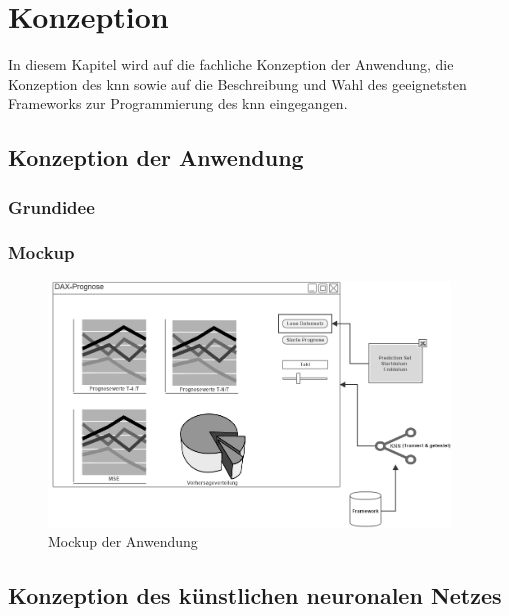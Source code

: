 \chapter{Konzeption}
\label{chapter:Konzeption}
In diesem Kapitel wird auf die fachliche Konzeption der Anwendung, die Konzeption des \ac{knn} sowie auf die Beschreibung und Wahl des geeignetsten Frameworks zur Programmierung des \ac{knn} eingegangen.

\section{Konzeption der Anwendung} %
\label{section:Konzeption der Anwendung} %

\subsection{Grundidee} %
\label{subsection:Grundidee} %

\subsection{Mockup} %
\label{subsection:Mockup} %

\begin{figure}[htbp]
\centering
		\includegraphics[width=0.95\textwidth]{mockup.PNG}
	\caption{Mockup der Anwendung}
	\label{fig:Mockup der Anwendung}
\end{figure}

\section{Konzeption des künstlichen neuronalen Netzes}
\label{section:Konzeption des künstlichen neuronalen Netzes}

